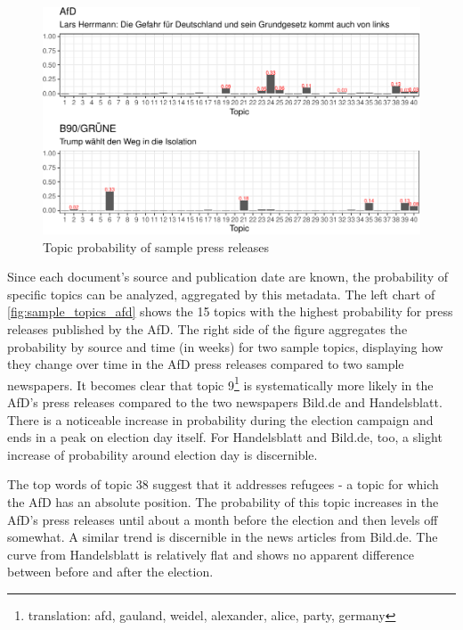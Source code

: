\documentclass[
  12pt,
]{article}
\begin{document}
\begin{figure}

{\centering \includegraphics[width=0.9\linewidth]{chap1_files/figure-latex/Press releases sample documents-1} 

}

\caption{Topic probability of sample press releases \label{fig:sample_docs34}}\label{fig:Press releases sample documents}
\end{figure}

Since each document's source and publication date are known, the
probability of specific topics can be analyzed, aggregated by this
metadata. The left chart of \autoref{fig:sample_topics_afd} shows the 15
topics with the highest probability for press releases published by the
AfD. The right side of the figure aggregates the probability by source
and time (in weeks) for two sample topics, displaying how they change
over time in the AfD press releases compared to two sample newspapers.
It becomes clear that topic 9\footnote{translation: afd, gauland,
  weidel, alexander, alice, party, germany} is systematically more
likely in the AfD's press releases compared to the two newspapers
Bild.de and Handelsblatt. There is a noticeable increase in probability
during the election campaign and ends in a peak on election day itself.
For Handelsblatt and Bild.de, too, a slight increase of probability
around election day is discernible.

The top words of topic 38 suggest that it addresses refugees - a topic
for which the AfD has an absolute position. The probability of this
topic increases in the AfD's press releases until about a month before
the election and then levels off somewhat. A similar trend is
discernible in the news articles from Bild.de. The curve from
Handelsblatt is relatively flat and shows no apparent difference between
before and after the election.
\end{document}
